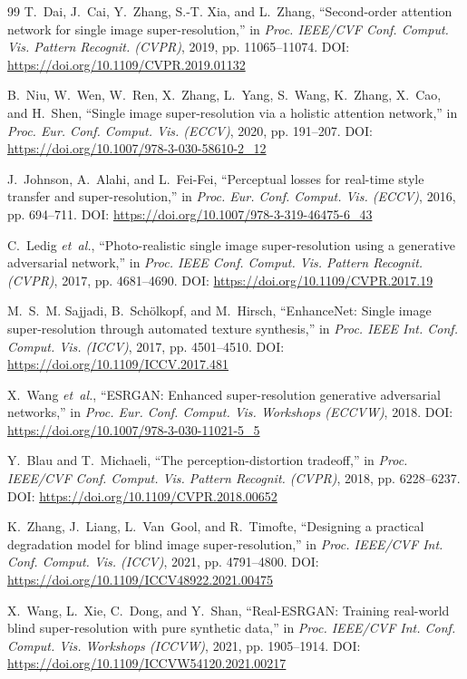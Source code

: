 \documentclass[10pt,onecolumn,journal]{IEEEtran}
\begin{document}
\begin{thebibliography}{99}
T.~Dai, J.~Cai, Y.~Zhang, S.-T. Xia, and L.~Zhang, ``Second-order attention network for single image super-resolution,'' in \emph{Proc. IEEE/CVF Conf. Comput. Vis. Pattern Recognit. (CVPR)}, 2019, pp. 11065--11074. DOI: \url{https://doi.org/10.1109/CVPR.2019.01132}

B.~Niu, W.~Wen, W.~Ren, X.~Zhang, L.~Yang, S.~Wang, K.~Zhang, X.~Cao, and H.~Shen, ``Single image super-resolution via a holistic attention network,'' in \emph{Proc. Eur. Conf. Comput. Vis. (ECCV)}, 2020, pp. 191--207. DOI: \url{https://doi.org/10.1007/978-3-030-58610-2_12}

J.~Johnson, A.~Alahi, and L.~Fei-Fei, ``Perceptual losses for real-time style transfer and super-resolution,'' in \emph{Proc. Eur. Conf. Comput. Vis. (ECCV)}, 2016, pp. 694--711. DOI: \url{https://doi.org/10.1007/978-3-319-46475-6_43}

C.~Ledig \emph{et~al.}, ``Photo-realistic single image super-resolution using a generative adversarial network,'' in \emph{Proc. IEEE Conf. Comput. Vis. Pattern Recognit. (CVPR)}, 2017, pp. 4681--4690. DOI: \url{https://doi.org/10.1109/CVPR.2017.19}

M.~S.~M. Sajjadi, B.~Sch{\"o}lkopf, and M.~Hirsch, ``EnhanceNet: Single image super-resolution through automated texture synthesis,'' in \emph{Proc. IEEE Int. Conf. Comput. Vis. (ICCV)}, 2017, pp. 4501--4510. DOI: \url{https://doi.org/10.1109/ICCV.2017.481}

X.~Wang \emph{et~al.}, ``ESRGAN: Enhanced super-resolution generative adversarial networks,'' in \emph{Proc. Eur. Conf. Comput. Vis. Workshops (ECCVW)}, 2018. DOI: \url{https://doi.org/10.1007/978-3-030-11021-5_5}

Y.~Blau and T.~Michaeli, ``The perception-distortion tradeoff,'' in \emph{Proc. IEEE/CVF Conf. Comput. Vis. Pattern Recognit. (CVPR)}, 2018, pp. 6228--6237. DOI: \url{https://doi.org/10.1109/CVPR.2018.00652}

K.~Zhang, J.~Liang, L.~Van~Gool, and R.~Timofte, ``Designing a practical degradation model for blind image super-resolution,'' in \emph{Proc. IEEE/CVF Int. Conf. Comput. Vis. (ICCV)}, 2021, pp. 4791--4800. DOI: \url{https://doi.org/10.1109/ICCV48922.2021.00475}

X.~Wang, L.~Xie, C.~Dong, and Y.~Shan, ``Real-ESRGAN: Training real-world blind super-resolution with pure synthetic data,'' in \emph{Proc. IEEE/CVF Int. Conf. Comput. Vis. Workshops (ICCVW)}, 2021, pp. 1905--1914. DOI: \url{https://doi.org/10.1109/ICCVW54120.2021.00217}


\end{thebibliography}
\end{document}
